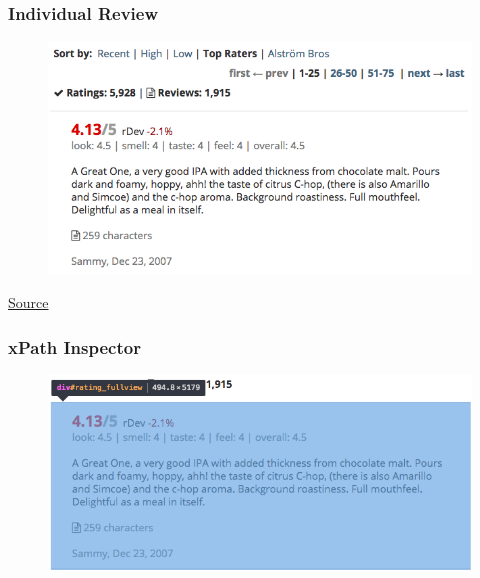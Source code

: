 \begin{frame}
    \frametitle{Individual Review}
    \vspace{-25pt}
    \begin{figure}[htb]
        \begin{center}
            \includegraphics[scale=0.5]{img/figures/rating}
        \end{center}

\end{figure}
\vspace{-20pt}
\begin{flushright}
\textcolor{iseblue}{\href{https://www.beeradvocate.com/beer/profile/147/38470/?view=beer&sort=topr&start=0}{Source}}
\end{flushright}
\end{frame}

\begin{frame}
    \frametitle{xPath Inspector}
    \vspace{-25pt}
    \begin{figure}[htb]
        \begin{center}
            \includegraphics[scale=0.5]{img/figures/xpath}
        \end{center}

\end{figure}
\vspace{-20pt}

\end{frame}


